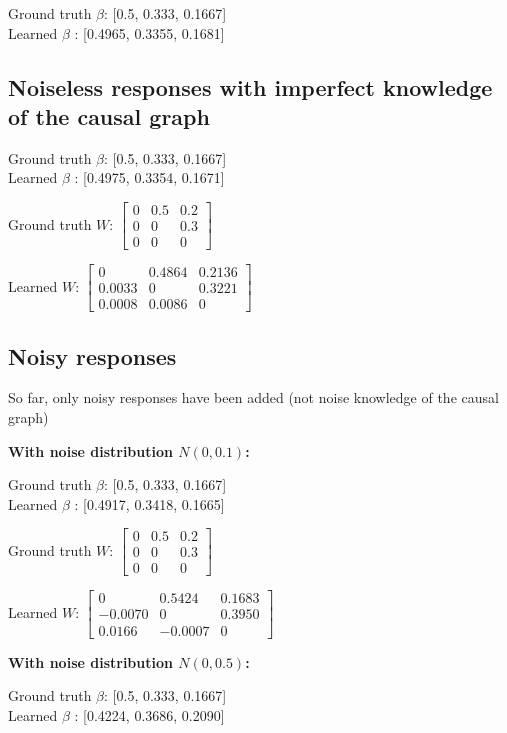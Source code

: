 Ground truth $\beta$: [0.5, 0.333, 0.1667] \\
Learned $\beta$ : [0.4965, 0.3355, 0.1681]

\subsection{Noiseless responses with imperfect knowledge of the causal graph}

Ground truth $\beta$: [0.5, 0.333, 0.1667] \\
Learned $\beta$ : [0.4975, 0.3354, 0.1671]

Ground truth $W$: $\begin{bmatrix}
	0 & 0.5 & 0.2 \\
	0 & 0 & 0.3 \\
	0 & 0 & 0
\end{bmatrix}$

Learned $W$: $\begin{bmatrix}
	0 & 0.4864 & 0.2136 \\
	0.0033 & 0 & 0.3221 \\
	0.0008 & 0.0086 & 0
\end{bmatrix}$


\subsection{Noisy responses}

So far, only noisy responses have been added (not noise knowledge of the causal graph)

\textbf{With noise distribution $N(0, 0.1)$:}

Ground truth $\beta$: [0.5, 0.333, 0.1667] \\
Learned $\beta$ : [0.4917, 0.3418, 0.1665]

Ground truth $W$: $\begin{bmatrix}
	0 & 0.5 & 0.2 \\
	0 & 0 & 0.3 \\
	0 & 0 & 0
\end{bmatrix}$

Learned $W$: $\begin{bmatrix}
	0 & 0.5424 & 0.1683 \\
	-0.0070 & 0 & 0.3950 \\
	0.0166 & -0.0007 & 0
\end{bmatrix}$


\textbf{With noise distribution $N(0, 0.5)$:}

Ground truth $\beta$: [0.5, 0.333, 0.1667] \\
Learned $\beta$ : [0.4224, 0.3686, 0.2090]

